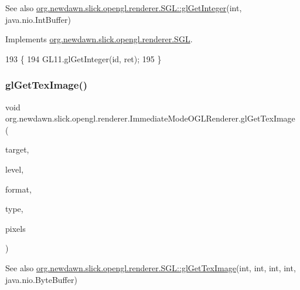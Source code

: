 \begin{DoxySeeAlso}{See also}
\mbox{\hyperlink{interfaceorg_1_1newdawn_1_1slick_1_1opengl_1_1renderer_1_1_s_g_l_ab04cb68029b55582eb4b17b489cbbb2f}{org.\+newdawn.\+slick.\+opengl.\+renderer.\+S\+G\+L\+::gl\+Get\+Integer}}(int, java.\+nio.\+Int\+Buffer) 
\end{DoxySeeAlso}


Implements \mbox{\hyperlink{interfaceorg_1_1newdawn_1_1slick_1_1opengl_1_1renderer_1_1_s_g_l_ab04cb68029b55582eb4b17b489cbbb2f}{org.\+newdawn.\+slick.\+opengl.\+renderer.\+S\+GL}}.


\begin{DoxyCode}
193                                                     \{
194         GL11.glGetInteger(\textcolor{keywordtype}{id}, ret);
195     \}
\end{DoxyCode}
\mbox{\label{classorg_1_1newdawn_1_1slick_1_1opengl_1_1renderer_1_1_immediate_mode_o_g_l_renderer_ab017144e4767647b0fe593feda2ba5cd}} 
\subsubsection{\texorpdfstring{gl\+Get\+Tex\+Image()}{glGetTexImage()}}
{\footnotesize\ttfamily void org.\+newdawn.\+slick.\+opengl.\+renderer.\+Immediate\+Mode\+O\+G\+L\+Renderer.\+gl\+Get\+Tex\+Image (\begin{DoxyParamCaption}\item[{int}]{target,  }\item[{int}]{level,  }\item[{int}]{format,  }\item[{int}]{type,  }\item[{Byte\+Buffer}]{pixels }\end{DoxyParamCaption})\hspace{0.3cm}{\ttfamily [inline]}}

\begin{DoxySeeAlso}{See also}
\mbox{\hyperlink{interfaceorg_1_1newdawn_1_1slick_1_1opengl_1_1renderer_1_1_s_g_l_a2df0054d4c79f4f9d854a7b55975ecc0}{org.\+newdawn.\+slick.\+opengl.\+renderer.\+S\+G\+L\+::gl\+Get\+Tex\+Image}}(int, int, int, int, java.\+nio.\+Byte\+Buffer) 
\end{DoxySeeAlso}


